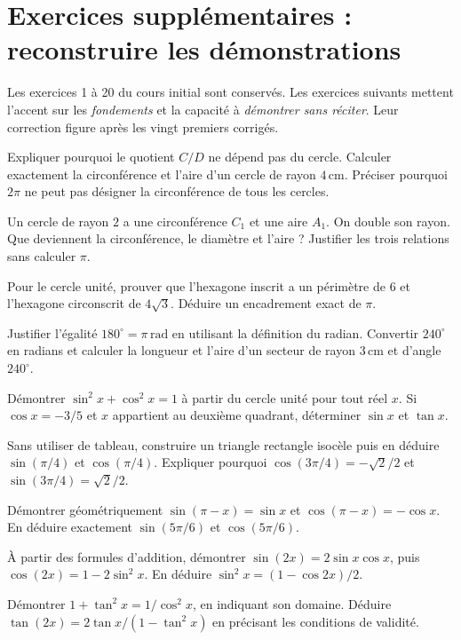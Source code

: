 \chapter{Exercices supplémentaires : reconstruire les démonstrations}
Les exercices 1 à 20 du cours initial sont conservés. Les exercices suivants mettent l'accent sur les \emph{fondements} et la capacité à \emph{démontrer sans réciter}. Leur correction figure après les vingt premiers corrigés.

Expliquer pourquoi le quotient $C/D$ ne dépend pas du cercle. Calculer exactement la circonférence et l'aire d'un cercle de rayon $4\,\mathrm{cm}$. Préciser pourquoi $2\pi$ ne peut pas désigner la circonférence de tous les cercles.

Un cercle de rayon $2$ a une circonférence $C_1$ et une aire $A_1$. On double son rayon. Que deviennent la circonférence, le diamètre et l'aire ? Justifier les trois relations sans calculer $\pi$.

Pour le cercle unité, prouver que l'hexagone inscrit a un périmètre de $6$ et l'hexagone circonscrit de $4\sqrt3$. Déduire un encadrement exact de $\pi$.

Justifier l'égalité $180^\circ=\pi\,\mathrm{rad}$ en utilisant la définition du radian. Convertir $240^\circ$ en radians et calculer la longueur et l'aire d'un secteur de rayon $3\,\mathrm{cm}$ et d'angle $240^\circ$.

Démontrer $\sin^2x+\cos^2x=1$ à partir du cercle unité pour tout réel $x$. Si $\cos x=-3/5$ et $x$ appartient au deuxième quadrant, déterminer $\sin x$ et $\tan x$.

Sans utiliser de tableau, construire un triangle rectangle isocèle puis en déduire $\sin(\pi/4)$ et $\cos(\pi/4)$. Expliquer pourquoi $\cos(3\pi/4)=-\sqrt2/2$ et $\sin(3\pi/4)=\sqrt2/2$.

Démontrer géométriquement $\sin(\pi-x)=\sin x$ et $\cos(\pi-x)=-\cos x$. En déduire exactement $\sin(5\pi/6)$ et $\cos(5\pi/6)$.

À partir des formules d'addition, démontrer $\sin(2x)=2\sin x\cos x$, puis $\cos(2x)=1-2\sin^2x$. En déduire $\sin^2x=(1-\cos2x)/2$.

Démontrer $1+\tan^2x=1/\cos^2x$, en indiquant son domaine. Déduire $\tan(2x)=2\tan x/(1-\tan^2x)$ en précisant les conditions de validité.


